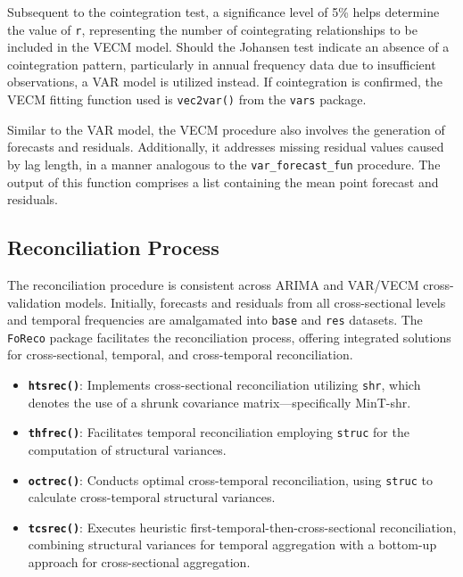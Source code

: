 \documentclass[11pt,a4paper,]{article}
\providecommand{\tightlist}{%
  \setlength{\itemsep}{0pt}\setlength{\parskip}{0pt}}
\begin{document}
Subsequent to the cointegration test, a significance level of 5\% helps determine the value of \texttt{r}, representing the number of cointegrating relationships to be included in the VECM model. Should the Johansen test indicate an absence of a cointegration pattern, particularly in annual frequency data due to insufficient observations, a VAR model is utilized instead. If cointegration is confirmed, the VECM fitting function used is \texttt{vec2var()} from the \texttt{vars} package.

Similar to the VAR model, the VECM procedure also involves the generation of forecasts and residuals. Additionally, it addresses missing residual values caused by lag length, in a manner analogous to the \texttt{var\_forecast\_fun} procedure. The output of this function comprises a list containing the mean point forecast and residuals.

\subsection{Reconciliation Process}\label{reconciliation-process}

The reconciliation procedure is consistent across ARIMA and VAR/VECM cross-validation models. Initially, forecasts and residuals from all cross-sectional levels and temporal frequencies are amalgamated into \texttt{base} and \texttt{res} datasets. The \texttt{FoReco} package facilitates the reconciliation process, offering integrated solutions for cross-sectional, temporal, and cross-temporal reconciliation.

\begin{itemize}
\tightlist
\item
  \textbf{\texttt{htsrec()}}: Implements cross-sectional reconciliation utilizing \texttt{shr}, which denotes the use of a shrunk covariance matrix---specifically MinT-shr.
\item
  \textbf{\texttt{thfrec()}}: Facilitates temporal reconciliation employing \texttt{struc} for the computation of structural variances.
\item
  \textbf{\texttt{octrec()}}: Conducts optimal cross-temporal reconciliation, using \texttt{struc} to calculate cross-temporal structural variances.
\item
  \textbf{\texttt{tcsrec()}}: Executes heuristic first-temporal-then-cross-sectional reconciliation, combining structural variances for temporal aggregation with a bottom-up approach for cross-sectional aggregation.
\end{itemize}
\end{document}
